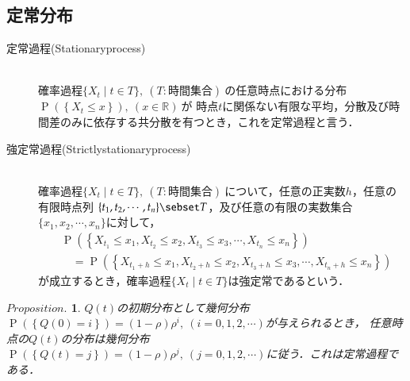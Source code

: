 \documentclass[a4j,papersize,disablejfam,slide,14pt]{jsarticle}
\newtheorem{Prop}{$Proposition.$}
\def\prob#1{\operatorname{P} \left(\left\{ #1 \right\}\right)} %
\begin{document}
\subsection{定常分布}
	\begin{screen}
    	\begin{description}
        	\item[定常過程{\rm (Stationary\quad process)}]\mbox{}\\
            	確率過程$\{ X_t \mid t \in T \},\ (T:\mbox{時間集合})\ $の任意時点における分布$\prob{X_t \leq x},\ (x \in \mathbb{R})\ $が
                時点$t$に関係ない有限な平均，分散及び時間差のみに依存する共分散を有つとき，これを定常過程と言う．
            \mbox{}\\
            \item[強定常過程{\rm (Strictly\quad stationary\quad process)}]\mbox{}\\
            	確率過程$\{ X_t \mid t \in T \},\ (T:\mbox{時間集合})\ $について，任意の正実数$h$，任意の有限時点列
                $\{t_1, t_2, \cdots ,t_n\} \sebset T$，及び任意の有限の実数集合$\{x_1, x_2, \cdots ,x_n\}$に対して，
                \begin{align}
                	&\prob{X_t_1 \leq x_1, X_t_2 \leq x_2, X_t_3 \leq x_3, \cdots,X_t_n \leq x_n} \\
                    &\quad= \prob{X_{t_1+h} \leq x_1, X_{t_2+h} \leq x_2, X_{t_3+h} \leq x_3, \cdots,X_{t_n+h} \leq x_n}
                \end{align}
                が成立するとき，確率過程$\{ X_t \mid t \in T \}$は強定常であるという．
        \end{description}
    \end{screen}
	\begin{screen}
    	\begin{Prop}
    		$Q(t)$の初期分布として幾何分布$\prob{Q(0)=i}=(1-\rho)\rho^i,\ (i=0,1,2,\cdots)$が与えられるとき，
        	任意時点の$Q(t)$の分布は幾何分布$\prob{Q(t)=j}=(1-\rho)\rho^j,\ (j=0,1,2,\cdots)$に従う．これは定常過程である．
    	\end{Prop}
    \end{screen}
\end{document}
